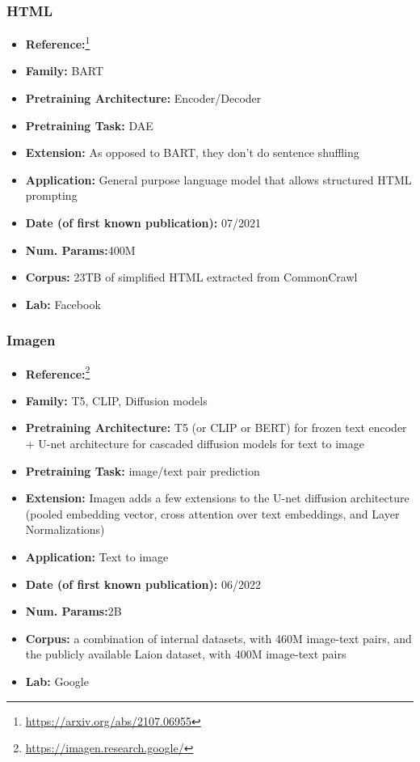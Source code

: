 \documentclass{article}
\begin{document}
\subsubsection{HTML}

            \begin{itemize}
                \item \textbf{Reference:}\footnote{\url{https://arxiv.org/abs/2107.06955}}\cite{aghajanyan2021htlm}
                \item \textbf{Family:} BART 
                \item \textbf{Pretraining Architecture:} Encoder/Decoder
                \item \textbf{Pretraining Task:} DAE
                \item \textbf{Extension:} As opposed to BART, they don’t do sentence shuffling  
                \item \textbf{Application:} General purpose language model that allows structured HTML prompting 
                \item \textbf{Date (of first known publication):} 07/2021
                \item \textbf{Num. Params:}400M
                \item \textbf{Corpus:} 23TB of simplified HTML extracted from CommonCrawl
                \item \textbf{Lab:} Facebook
            \end{itemize}

\subsubsection{Imagen}

            \begin{itemize}
                \item \textbf{Reference:}\footnote{\url{https://imagen.research.google/}}\cite{saharia2022photorealistic}
                \item \textbf{Family:} T5, CLIP, Diffusion models 
                \item \textbf{Pretraining Architecture:} T5 (or CLIP or BERT) for frozen text encoder + U-net architecture for cascaded diffusion models for text to image
                \item \textbf{Pretraining Task:} image/text pair prediction
                \item \textbf{Extension:} Imagen adds a few extensions to the U-net diffusion architecture (pooled embedding vector, cross attention over text embeddings, and Layer Normalizations)  
                \item \textbf{Application:} Text to image
                \item \textbf{Date (of first known publication):} 06/2022
                \item \textbf{Num. Params:}2B
                \item \textbf{Corpus:} a combination of internal datasets, with 460M image-text pairs, and the publicly available Laion dataset, with 400M image-text pairs
                \item \textbf{Lab:} Google
            \end{itemize}
            
\end{document}
